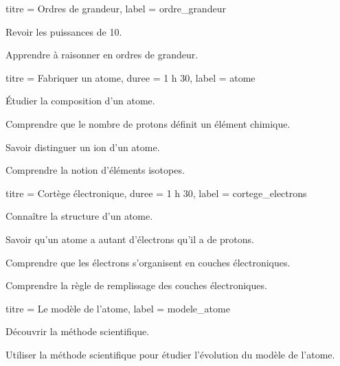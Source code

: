 \documentclass[12pt]{extarticle}
\begin{document}
\begin{boiteCodeTex}{}

  \setcounter{activiteNum}{0}
  \begin{multicols}{2}
    \begin{activite}{titre = Ordres de grandeur, label = ordre_grandeur}
      \begin{objectifs}  
        \item Revoir les puissances de 10.
        \item Apprendre à raisonner en ordres de grandeur.
      \end{objectifs}
    \end{activite}
    \begin{TP}{titre = Fabriquer un atome, duree = 1 h 30, label = atome}
      \begin{objectifs}
        \item Étudier la composition d'un atome.
        \item Comprendre que le nombre de protons définit un élément chimique.
        \item Savoir distinguer un ion d'un atome.
        \item Comprendre la notion d'éléments isotopes.
      \end{objectifs}
    \end{TP}
    \begin{activite}{titre = Cortège électronique, duree = 1 h 30, label = cortege_electrons}
      \begin{prerequis}
        \item Connaître la structure d'un atome.
        \item Savoir qu'un atome a autant d'électrons qu'il a de protons.
      \end{prerequis}
      \begin{objectifs}
        \item Comprendre que les électrons s'organisent en couches électroniques.
        \item Comprendre la règle de remplissage des couches électroniques.
      \end{objectifs}
    \end{activite}
    \begin{TP}{titre = Le modèle de l'atome, label = modele_atome}
      \begin{objectifs}
          \item Découvrir la méthode scientifique.
          \item Utiliser la méthode scientifique pour étudier l'évolution du modèle de l'atome.
      \end{objectifs}
    \end{TP}
  \end{multicols}


\end{boiteCodeTex}
\end{document}

